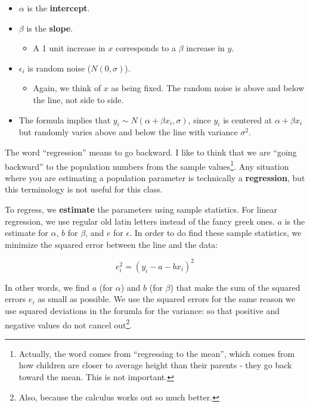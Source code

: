 \documentclass[
  letterpaper,
  DIV=11,
  numbers=noendperiod]{scrreprt}
\providecommand{\tightlist}{%
  \setlength{\itemsep}{0pt}\setlength{\parskip}{0pt}}\usepackage{longtable,booktabs,array}
\begin{document}
\begin{itemize}
\tightlist
\item
  \(\alpha\) is the \textbf{intercept}.
\item
  \(\beta\) is the \textbf{slope}.

  \begin{itemize}
  \tightlist
  \item
    A 1 unit increase in \(x\) corresponds to a \(\beta\) increase in
    \(y\).
  \end{itemize}
\item
  \(\epsilon_i\) is random noise (\(N(0,\sigma)\)).

  \begin{itemize}
  \tightlist
  \item
    Again, we think of \(x\) as being fixed. The random noise is above
    and below the line, not side to side.
  \end{itemize}
\item
  The formula implies that \(y_i \sim N(\alpha + \beta x_i, \sigma)\),
  since \(y_i\) is centered at \(\alpha + \beta x_i\) but randomly
  varies above and below the line with variance \(\sigma^2\).
\end{itemize}

The word ``regression'' means to go backward. I like to think that we
are ``going backward'' to the population numbers from the sample
values\footnote{Actually, the word comes from ``regressing to the
  mean'', which comes from how children are closer to average height
  than their parents - they go back toward the mean. This is not
  important.}. Any situation where you are estimating a population
parameter is technically a \textbf{regression}, but this terminology is
not useful for this class.

To regress, we \textbf{estimate} the parameters using sample statistics.
For linear regression, we use regular old latin letters instead of the
fancy greek ones. \(a\) is the estimate for \(\alpha\), \(b\) for
\(\beta\), and \(e\) for \(\epsilon\). In order to do find these sample
statistics, we minimize the squared error between the line and the data:

\[e_i^2 = (y_i - a - b x_i)^2\]

In other words, we find \(a\) (for \(\alpha\)) and \(b\) (for \(\beta\))
that make the sum of the squared errors \(e_i\) as small as possible. We
use the squared errors for the same reason we use squared deviations in
the forumla for the variance: so that positive and negative values do
not cancel out\footnote{Also, because the calculus works out so much
  better.}.
\end{document}
